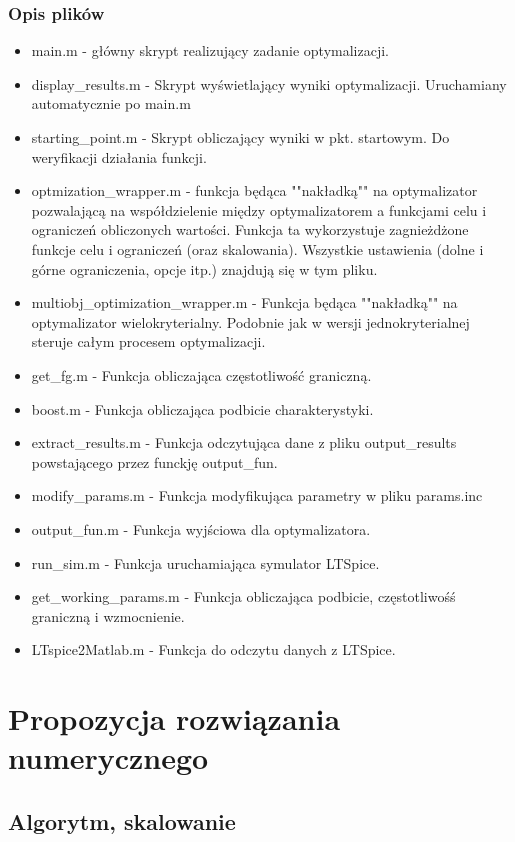 \documentclass{article}
\begin{document}
\subsubsection*{Opis plików}
\begin{itemize}
    \item main.m - główny skrypt realizujący zadanie optymalizacji.
    \item display\_results.m - Skrypt wyświetlający wyniki optymalizacji. Uruchamiany automatycznie po main.m
    \item starting\_point.m - Skrypt obliczający wyniki w pkt. startowym. Do weryfikacji działania funkcji.
    \item optmization\_wrapper.m - funkcja będąca ""nakładką"" na optymalizator pozwalającą na współdzielenie między optymalizatorem a funkcjami celu i ograniczeń
          obliczonych wartości. Funkcja ta wykorzystuje zagnieżdżone funkcje celu i ograniczeń (oraz skalowania). Wszystkie ustawienia (dolne i górne ograniczenia, opcje itp.) znajdują się w tym pliku.
    \item multiobj\_optimization\_wrapper.m - Funkcja będąca ""nakładką"" na optymalizator wielokryterialny. Podobnie jak w wersji jednokryterialnej steruje całym procesem optymalizacji.
    \item get\_fg.m - Funkcja obliczająca częstotliwość graniczną.
    \item boost.m - Funkcja obliczająca podbicie charakterystyki.
    \item extract\_results.m - Funkcja odczytująca dane z pliku output\_results powstającego przez funckję output\_fun.
    \item modify\_params.m - Funkcja modyfikująca parametry w pliku params.inc
    \item output\_fun.m - Funkcja wyjściowa dla optymalizatora.
    \item run\_sim.m - Funkcja uruchamiająca symulator LTSpice.
    \item get\_working\_params.m - Funkcja obliczająca podbicie, częstotliwośś graniczną i wzmocnienie.
    \item LTspice2Matlab.m - Funkcja do odczytu danych z LTSpice.
\end{itemize}

\section{Propozycja rozwiązania numerycznego}
\subsection{Algorytm, skalowanie}
\end{document}
